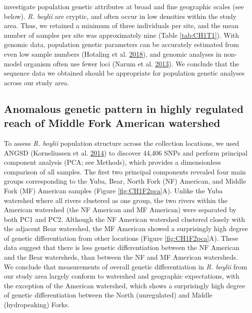 \documentclass[twoside,12pt,final]{ucthesis-CA2012} %
\begin{document}
\begin{ucmainmatter}
investigate population genetic attributes at broad and fine geographic
scales (see below). \emph{R. boylii} are cryptic, and often occur in low
densities within the study area. Thus, we retained a minimum of three
individuals per site, and the mean number of samples per site was
approximately nine (Table \ref{tab:CH1T1}). With genomic data,
population genetic parameters can be accurately estimated from even low
sample numbers (Hotaling et al.
\protect\hyperlink{ref-hotaling_demographic_2018}{2018}), and genomic
analyses in non-model organism often use fewer loci (Narum et al.
\protect\hyperlink{ref-narum_genotyping-by-sequencing_2013}{2013}). We
conclude that the sequence data we obtained should be appropriate for
population genetic analyses across our study area.

\hypertarget{anomalous-genetic-pattern-in-highly-regulated-reach-of-middle-fork-american-watershed}{%
\subsection{Anomalous genetic pattern in highly regulated reach of
Middle Fork American
watershed}\label{anomalous-genetic-pattern-in-highly-regulated-reach-of-middle-fork-american-watershed}}

To assess \emph{R. boylii} population structure across the collection
locations, we used ANGSD (Korneliussen et al.
\protect\hyperlink{ref-korneliussen_angsd_2014}{2014}) to discover
44,406 SNPs and perform principal component analysis (PCA; see Methods),
which provides a dimensionless comparison of all samples. The first two
principal components revealed four main groups corresponding to the
Yuba, Bear, North Fork (NF) American, and Middle Fork (MF) American
samples (Figure \ref{fig:CH1F2pca}A). Unlike the Yuba watershed where
all rivers clustered as one group, the two rivers within the American
watershed (the NF American and MF American) were separated by both PC1
and PC2. Although the NF American watershed clustered closely with the
adjacent Bear watershed, the MF American showed a surprisingly high
degree of genetic differentiation from other locations (Figure
\ref{fig:CH1F2pca}A). These data suggest that there is less genetic
differentiation between the NF American and the Bear watersheds, than
between the NF and MF American watersheds. We conclude that measurements
of overall genetic differentiation in \emph{R. boylii} from our study
area largely conform to watershed and geographic expectations, with the
exception of the American watershed, which shows a surprisingly high
degree of genetic differentiation between the North (unregulated) and
Middle (hydropeaking) Forks.





\end{ucmainmatter}
\end{document}
